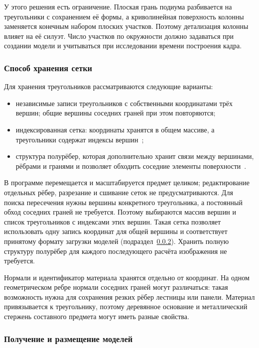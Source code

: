 У этого решения есть ограничение. Плоская грань подиума разбивается на треугольники с сохранением её формы, а криволинейная поверхность колонны заменяется конечным набором плоских участков. Поэтому детализация колонны влияет на её силуэт. Число участков по окружности должно задаваться при создании модели и учитываться при исследовании времени построения кадра.

\subsubsection{Способ хранения сетки}

Для хранения треугольников рассматриваются следующие варианты:
\begin{itemize}
  \item независимые записи треугольников с собственными координатами трёх вершин; общие вершины соседних граней при этом повторяются;
  \item индексированная сетка: координаты хранятся в общем массиве, а треугольники содержат индексы вершин~\cite[разд.~6.5]{pbrt4};
  \item структура полурёбер, которая дополнительно хранит связи между вершинами, рёбрами и гранями и позволяет обходить соседние элементы поверхности~\cite{cgal-surface-mesh}.
\end{itemize}

В программе перемещается и масштабируется предмет целиком; редактирование отдельных рёбер, разрезание и сшивание сеток не предусматриваются. Для поиска пересечения нужны вершины конкретного треугольника, а постоянный обход соседних граней не требуется. Поэтому выбираются массив вершин и список треугольников с индексами этих вершин. Такая сетка позволяет использовать одну запись координат для общей вершины и соответствует принятому формату загрузки моделей (подраздел~\ref{subsubsec:model-loading}). Хранить полную структуру полурёбер для каждого последующего расчёта изображения не требуется.

Нормали и идентификатор материала хранятся отдельно от координат. На одном геометрическом ребре нормали соседних граней могут различаться: такая возможность нужна для сохранения резких рёбер лестницы или панели. Материал привязывается к треугольнику, поэтому деревянное основание и металлический стержень составного предмета могут иметь разные свойства.

\subsubsection{Получение и размещение моделей}
\label{subsubsec:model-loading}

